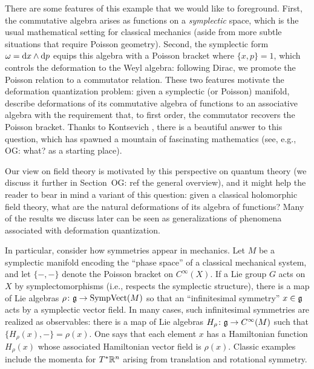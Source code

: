 \documentclass[11pt]{amsart}
\def\owen#1{{\textcolor{violet!50!black}{OG: {#1}}}}
\begin{document}
There are some features of this example that we would like to foreground. 
First, the commutative algebra arises as functions on a {\em symplectic} space,
which is the usual mathematical setting for classical mechanics (aside from more subtle situations that require Poisson geometry).
Second, the symplectic form $\omega = {\rm d} x \wedge {\rm d} p$ equips this algebra 
with a Poisson bracket where $\{ x, p \} = 1$,
which controls the deformation to the Weyl algebra: following Dirac, we promote the Poisson relation to a commutator relation.
These two features motivate the deformation quantization problem: 
given a symplectic (or Poisson) manifold,
describe deformations of its commutative algebra of functions to an associative algebra with the requirement that, to first order,  the commutator recovers the Poisson bracket.
Thanks to Kontsevich \cite{KonDQ}, there is a beautiful answer to this question, which has spawned a mountain of fascinating mathematics (see, e.g., \owen{what?} as a starting place).

Our view on field theory is motivated by this perspective on quantum theory (we discuss it further in Section~\owen{ref the general overview}), 
and it might help the reader to bear in mind a variant of this question:
given a classical holomorphic field theory, what are the natural deformations of its algebra of functions?
Many of the results we discuss later can be seen as generalizations of phenomena associated with deformation quantization.

In particular, consider how symmetries appear in mechanics.
Let $M$ be a symplectic manifold encoding the ``phase space'' of a classical mechanical system,
and let $\{-,-\}$ denote the Poisson bracket on $C^\infty(X)$.
If a Lie group $G$ acts on $X$ by symplectomorphisms (i.e., respects the symplectic structure),
there is a map of Lie algebras $\rho \colon\mathfrak g \to {\rm SympVect}(M)$ so that an ``infinitesimal symmetry'' $x \in \mathfrak g$ acts by a symplectic vector field.
In many cases, such infinitesimal symmetries are realized as observables: 
there is a map of Lie algebras $H_\rho \colon \mathfrak g \to C^\infty(M)$ such that $\{ H_\rho(x), - \} = \rho(x)$.
One says that each element $x$ has a Hamiltonian function $H_\rho(x)$ whose associated Hamiltonian vector field is $\rho(x)$.
Classic examples include the momenta for $T^* \mathbb R^n$ arising from translation and rotational symmetry.
\end{document}
